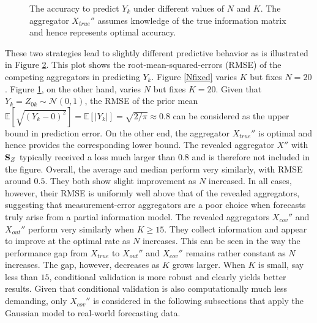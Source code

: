 \documentclass[11pt]{article}
\newcommand{\E}{\mathbb{E}}
\theoremstyle{definition}
\theoremstyle{definition}
\def\SS{{\bf S}}
\def\E{{\mathbb E}}
\begin{document}
\begin{figure}[t!]
\begin{subfigure}{0.5\textwidth}
                                \label{Kfixed}
        \end{subfigure}
         \caption{The accuracy to predict $Y_k$ under different values of $N$ and $K$. The aggregator $X_{true}''$ assumes knowledge of the true information matrix and hence represents optimal accuracy.}
        \label{XEstimation}
\end{figure}





These two strategies lead to slightly different predictive behavior as is illustrated in Figure \ref{XEstimation}. This plot shows the root-mean-squared-errors (RMSE) of the competing aggregators in predicting $Y_k$. Figure \ref{Nfixed} varies $K$ but fixes $N = 20$.  Figure \ref{Kfixed}, on the other hand,  varies $N$ but fixes $K = 20$. Given that $Y_k = Z_{0k} \sim \mathcal{N}(0,1)$, the RMSE of the prior mean $\E[\sqrt{(Y_k-0)^2}] = \E[|Y_k|] = \sqrt{2/\pi} \approx 0.8$ can be considered as the upper bound in prediction error. On the other end, the aggregator $X_{true}''$ is optimal and hence provides the corresponding lower bound. The revealed aggregator $X''$ with $\SS_Z$ typically received a loss much larger than $0.8$ and is therefore not included in the figure. Overall, the average and median perform very similarly, with RMSE around $0.5$. They both show slight improvement as $N$ increased. In all cases, however, their RMSE is uniformly well above that of the revealed aggregators, suggesting that measurement-error aggregators are a poor choice when forecasts truly arise from a partial information model. The revealed aggregators $X_{cov}''$ and $X_{out}''$ perform very similarly when $K \geq 15$. They collect information and appear to improve at the optimal rate as $N$ increases. This can be seen in the way the performance gap from $X_{true}$ to  $X_{out}''$ and $X_{cov}''$ remains rather constant as $N$ increases. The gap, however, decreases as $K$ grows larger.  When $K$ is small, say less than $15$, conditional validation is more robust and clearly yields better results. Given that conditional validation is also computationally much less demanding, only $X_{cov}''$ is considered in the following subsections that apply the Gaussian model to real-world forecasting data. 
  
\end{document}
